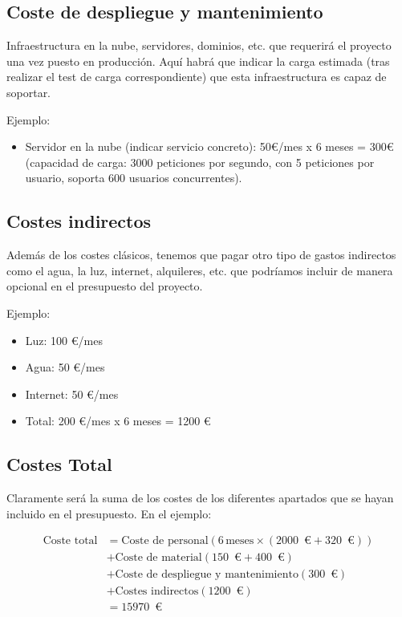 \subsection{Coste de despliegue y mantenimiento}

Infraestructura en la nube, servidores, dominios, etc. que requerirá el proyecto una vez puesto en producción. Aquí habrá que indicar la carga estimada (tras realizar el test de carga correspondiente) que esta infraestructura es capaz de soportar.

Ejemplo:
\begin{itemize}
\item Servidor en la nube (indicar servicio concreto): 50€/mes x 6 meses = 300€ (capacidad de carga: 3000 peticiones por segundo, con 5 peticiones por usuario, soporta 600 usuarios concurrentes).
\end{itemize}
        
\subsection{Costes indirectos}

Además de los costes clásicos, tenemos que pagar otro tipo de gastos indirectos como el agua, la luz, internet, alquileres, etc. que podríamos incluir de manera opcional en el presupuesto del proyecto.

Ejemplo:
\begin{itemize}
    \item Luz: 100 €/mes
    \item Agua: 50 €/mes 
    \item Internet: 50 €/mes
    \item Total: 200 €/mes x 6 meses = 1200 €
\end{itemize}
\subsection{Costes Total}
Claramente será la suma de los costes de los diferentes apartados que se hayan incluido en el presupuesto. En el ejemplo:

\begin{equation}
\begin{split}
    \text{Coste total} &= \text{Coste de personal} \left(6 \, \text{meses} \times (2000\,\text{ €} + 320\,\text{ €})\right) \\
    &+ \text{Coste de material} (150\,\text{ €} + 400\,\text{ €}) \\
    &+ \text{Coste de despliegue y mantenimiento} (300\,\text{ €}) \\
    &+ \text{Costes indirectos} (1200\,\text{ €}) \\
    &= 15970\,\text{ €}
\end{split}
\end{equation}

